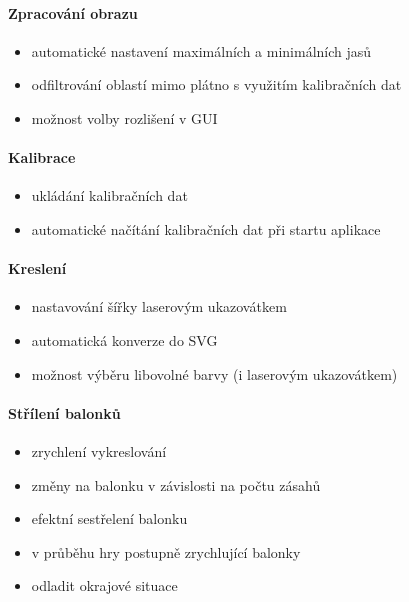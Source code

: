 \documentclass[twoside,12pt]{article}
\newcommand{\podpodsekce}[1]{\paragraph{#1}\quad\vskip 6pt}
\begin{document}
\podpodsekce{Zpracování obrazu}
\begin{itemize}
\item automatické nastavení maximálních a minimálních jasů
\item odfiltrování oblastí mimo plátno s využitím kalibračních dat
\item možnost volby rozlišení v GUI
\end{itemize}
\podpodsekce{Kalibrace}
\begin{itemize}
\item ukládání kalibračních dat
\item automatické načítání kalibračních dat při startu aplikace
\end{itemize}
\podpodsekce{Kreslení}
\begin{itemize}
\item nastavování šířky laserovým ukazovátkem
\item automatická konverze do SVG
\item možnost výběru libovolné barvy (i laserovým ukazovátkem)
\end{itemize}
\podpodsekce{Střílení balonků}
\begin{itemize}
\item zrychlení vykreslování
\item změny na balonku v závislosti na počtu zásahů
\item efektní sestřelení balonku
\item v průběhu hry postupně zrychlující balonky
\item odladit okrajové situace
\end{itemize}
\end{document}
